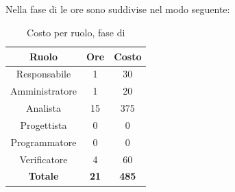 \subsection{\AD}
Nella fase di \AD le ore sono suddivise nel modo seguente:
\begin{table}[H]
	\centering
	\begin{tabular}{|c|c|c|}
		\hline
		\textbf{Ruolo} &
		\textbf{Ore} &
		\textbf{Costo} \\
		\hline
		Responsabile & 1 & 30\\
		\hline
		Amministratore & 1 & 20\\
		\hline
		Analista & 15 & 375\\
		\hline
		Progettista & 0 & 0 \\
		\hline
		Programmatore & 0 & 0 \\
		\hline
		Verificatore & 4 & 60\\
		\hline
		\textbf{Totale} & \textbf{21} & \textbf{485} \\
		\hline
	\end{tabular}
	\caption{Costo per ruolo, fase di \AD}
\end{table}

